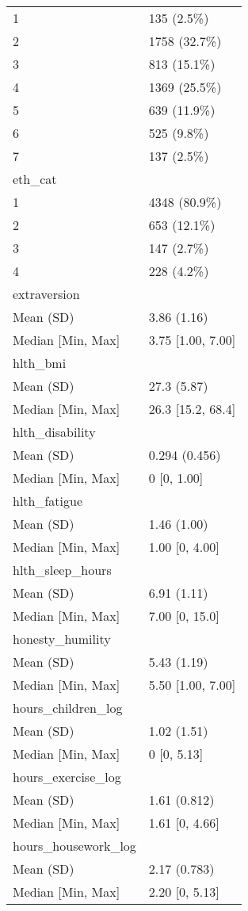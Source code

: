 \documentclass[
  singlecolumn,
  9pt]{article}
\begin{document}
\begin{longtable}[]{@{}ll@{}}
1 & 135 (2.5\%) \\
2 & 1758 (32.7\%) \\
3 & 813 (15.1\%) \\
4 & 1369 (25.5\%) \\
5 & 639 (11.9\%) \\
6 & 525 (9.8\%) \\
7 & 137 (2.5\%) \\
eth\_cat & \\
1 & 4348 (80.9\%) \\
2 & 653 (12.1\%) \\
3 & 147 (2.7\%) \\
4 & 228 (4.2\%) \\
extraversion & \\
Mean (SD) & 3.86 (1.16) \\
Median {[}Min, Max{]} & 3.75 {[}1.00, 7.00{]} \\
hlth\_bmi & \\
Mean (SD) & 27.3 (5.87) \\
Median {[}Min, Max{]} & 26.3 {[}15.2, 68.4{]} \\
hlth\_disability & \\
Mean (SD) & 0.294 (0.456) \\
Median {[}Min, Max{]} & 0 {[}0, 1.00{]} \\
hlth\_fatigue & \\
Mean (SD) & 1.46 (1.00) \\
Median {[}Min, Max{]} & 1.00 {[}0, 4.00{]} \\
hlth\_sleep\_hours & \\
Mean (SD) & 6.91 (1.11) \\
Median {[}Min, Max{]} & 7.00 {[}0, 15.0{]} \\
honesty\_humility & \\
Mean (SD) & 5.43 (1.19) \\
Median {[}Min, Max{]} & 5.50 {[}1.00, 7.00{]} \\
hours\_children\_log & \\
Mean (SD) & 1.02 (1.51) \\
Median {[}Min, Max{]} & 0 {[}0, 5.13{]} \\
hours\_exercise\_log & \\
Mean (SD) & 1.61 (0.812) \\
Median {[}Min, Max{]} & 1.61 {[}0, 4.66{]} \\
hours\_housework\_log & \\
Mean (SD) & 2.17 (0.783) \\
Median {[}Min, Max{]} & 2.20 {[}0, 5.13{]} \\

\end{longtable}
\end{document}
